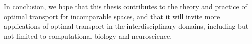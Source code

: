 
In conclusion, we hope that this thesis contributes to the theory and practice of optimal transport for
incomparable spaces, and that it will invite more applications of optimal transport in the interdisciplinary domains,
including but not limited to computational biology and neuroscience.

\vfill
